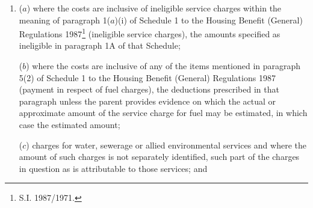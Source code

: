 \documentclass[12pt,a4paper]{article}
\begin{document}
\begin{enumerate}\item[]

($a$) where the costs are inclusive of ineligible service charges within the meaning of paragraph 1($a$)(i) of Schedule 1 to the Housing Benefit (General) Regulations 1987\footnote{\frenchspacing S.I. 1987/1971.} (ineligible service charges), the amounts specified as ineligible in paragraph 1A of that Schedule;

%

($b$) where the costs are inclusive of any of the items mentioned in paragraph 5(2) of Schedule 1 to the Housing Benefit (General) Regulations 1987 (payment in respect of fuel charges), the deductions prescribed in that paragraph unless the parent provides evidence on which the actual or approximate amount of the service charge for fuel may be estimated, in which case the estimated amount; 

($c$) charges for water, sewerage or allied environmental services and where the amount of such charges is not separately identified, such part of the charges in question as is attributable to those services;
and


\end{enumerate}
\end{document}
